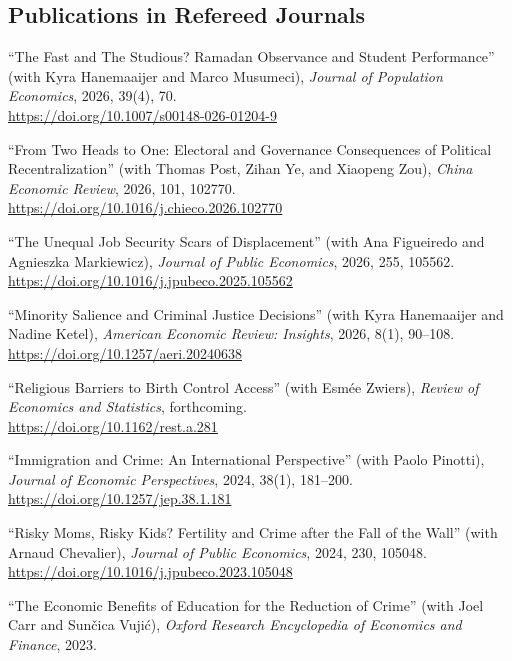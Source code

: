 \documentclass[11pt,a4paper]{article}
\begin{document}
\subsection{Publications in Refereed Journals}
\begin{pubs}
  \item ``The Fast and The Studious? Ramadan Observance and Student Performance'' (with Kyra Hanemaaijer and Marco Musumeci), \emph{Journal of Population Economics}, 2026, 39(4), 70.\\
  \url{https://doi.org/10.1007/s00148-026-01204-9}
  \item ``From Two Heads to One: Electoral and Governance Consequences of Political Recentralization'' (with Thomas Post, Zihan Ye, and Xiaopeng Zou), \emph{China Economic Review}, 2026, 101, 102770.\\
  \url{https://doi.org/10.1016/j.chieco.2026.102770}
  \item ``The Unequal Job Security Scars of Displacement'' (with Ana Figueiredo and Agnieszka Markiewicz), \emph{Journal of Public Economics}, 2026, 255, 105562.\\
  \url{https://doi.org/10.1016/j.jpubeco.2025.105562}
  \item ``Minority Salience and Criminal Justice Decisions'' (with Kyra Hanemaaijer and Nadine Ketel), \emph{American Economic Review: Insights}, 2026, 8(1), 90--108.\\
  \url{https://doi.org/10.1257/aeri.20240638}
  \item ``Religious Barriers to Birth Control Access'' (with Esm\'ee Zwiers), \emph{Review of Economics and Statistics}, forthcoming.\\
  \url{https://doi.org/10.1162/rest.a.281}
  \item ``Immigration and Crime: An International Perspective'' (with Paolo Pinotti), \emph{Journal of Economic Perspectives}, 2024, 38(1), 181--200.\\
  \url{https://doi.org/10.1257/jep.38.1.181}
  \item ``Risky Moms, Risky Kids? Fertility and Crime after the Fall of the Wall'' (with Arnaud Chevalier), \emph{Journal of Public Economics}, 2024, 230, 105048.\\
  \url{https://doi.org/10.1016/j.jpubeco.2023.105048}
  \item ``The Economic Benefits of Education for the Reduction of Crime'' (with Joel Carr and Sun\v{c}ica Vuji\'c), \emph{Oxford Research Encyclopedia of Economics and Finance}, 2023.\\

\end{pubs}
\end{document}
